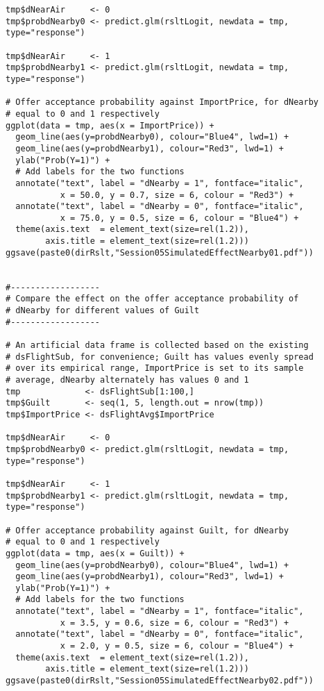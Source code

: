 \documentclass{article}
\begin{document}
\begin{tiny}
\begin{verbatim}
tmp$dNearAir     <- 0
tmp$probdNearby0 <- predict.glm(rsltLogit, newdata = tmp, type="response")

tmp$dNearAir     <- 1
tmp$probdNearby1 <- predict.glm(rsltLogit, newdata = tmp, type="response")

# Offer acceptance probability against ImportPrice, for dNearby 
# equal to 0 and 1 respectively
ggplot(data = tmp, aes(x = ImportPrice)) +
  geom_line(aes(y=probdNearby0), colour="Blue4", lwd=1) +
  geom_line(aes(y=probdNearby1), colour="Red3", lwd=1) +
  ylab("Prob(Y=1)") +
  # Add labels for the two functions
  annotate("text", label = "dNearby = 1", fontface="italic",
           x = 50.0, y = 0.7, size = 6, colour = "Red3") +
  annotate("text", label = "dNearby = 0", fontface="italic",
           x = 75.0, y = 0.5, size = 6, colour = "Blue4") +
  theme(axis.text  = element_text(size=rel(1.2)),
        axis.title = element_text(size=rel(1.2)))
ggsave(paste0(dirRslt,"Session05SimulatedEffectNearby01.pdf"))


#------------------
# Compare the effect on the offer acceptance probability of 
# dNearby for different values of Guilt
#------------------

# An artificial data frame is collected based on the existing
# dsFlightSub, for convenience; Guilt has values evenly spread
# over its empirical range, ImportPrice is set to its sample
# average, dNearby alternately has values 0 and 1
tmp             <- dsFlightSub[1:100,]
tmp$Guilt       <- seq(1, 5, length.out = nrow(tmp))
tmp$ImportPrice <- dsFlightAvg$ImportPrice

tmp$dNearAir     <- 0
tmp$probdNearby0 <- predict.glm(rsltLogit, newdata = tmp, type="response")

tmp$dNearAir     <- 1
tmp$probdNearby1 <- predict.glm(rsltLogit, newdata = tmp, type="response")

# Offer acceptance probability against Guilt, for dNearby 
# equal to 0 and 1 respectively
ggplot(data = tmp, aes(x = Guilt)) +
  geom_line(aes(y=probdNearby0), colour="Blue4", lwd=1) +
  geom_line(aes(y=probdNearby1), colour="Red3", lwd=1) +
  ylab("Prob(Y=1)") +
  # Add labels for the two functions
  annotate("text", label = "dNearby = 1", fontface="italic",
           x = 3.5, y = 0.6, size = 6, colour = "Red3") +
  annotate("text", label = "dNearby = 0", fontface="italic",
           x = 2.0, y = 0.5, size = 6, colour = "Blue4") +
  theme(axis.text  = element_text(size=rel(1.2)),
        axis.title = element_text(size=rel(1.2)))
ggsave(paste0(dirRslt,"Session05SimulatedEffectNearby02.pdf"))




\end{verbatim}
\end{tiny}
\end{document}

